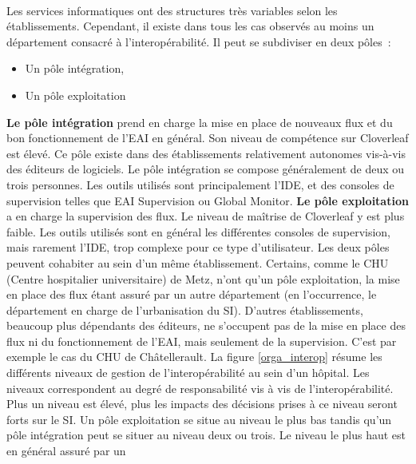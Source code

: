 			\paragraph{}%
			Les services informatiques ont des structures très variables selon les
			établissements. Cependant, il existe dans tous les cas observés au moins un
			département consacré à l’interopérabilité. Il peut se subdiviser
			en deux pôles~:
			\begin{itemize}
			  \item Un pôle intégration,
			  \item Un pôle exploitation
			\end{itemize}
			\textbf{Le pôle intégration} prend en charge la mise en place de nouveaux
			flux et du bon fonctionnement de l’EAI en général. Son niveau de compétence sur
			Cloverleaf est élevé. Ce pôle existe dans des établissements
			relativement autonomes vis-à-vis des éditeurs de logiciels. Le pôle
			intégration se compose généralement de deux ou trois personnes. Les outils
			utilisés sont principalement l’IDE, et des consoles de supervision telles que EAI
			Supervision ou Global Monitor.\newline
			\textbf{Le pôle exploitation} a en charge la supervision des flux. Le niveau
			de maîtrise de Cloverleaf y est plus faible. Les outils utilisés sont en
			général les différentes consoles de supervision,
			mais rarement l’IDE, trop complexe pour ce type d’utilisateur.\newline
			Les deux pôles peuvent cohabiter au sein d’un même établissement. Certains,
			comme le CHU (Centre hospitalier universitaire) de Metz, n’ont qu’un pôle
			exploitation, la mise en place des flux étant assuré par un autre département (en l’occurrence, le département
			en charge de l’urbanisation du SI). D’autres établissements, beaucoup plus
			dépendants des éditeurs, ne s’occupent pas de la mise en place des flux ni
			du fonctionnement de l’EAI, mais seulement de la supervision. C’est par
			exemple le cas du CHU de Châtellerault.\newline 
			La figure \ref{orga_interop} résume les
			différents niveaux de gestion de l’interopérabilité au sein d’un hôpital.
			Les niveaux correspondent au degré de responsabilité vis à vis de
			l'interopérabilité. Plus un niveau est élevé, plus les impacts des
			décisions prises à ce niveau seront forts sur le SI. Un pôle exploitation se
			situe au niveau le plus bas tandis qu’un pôle intégration peut se situer au
			niveau deux ou trois. Le niveau le plus haut est en général assuré par un
